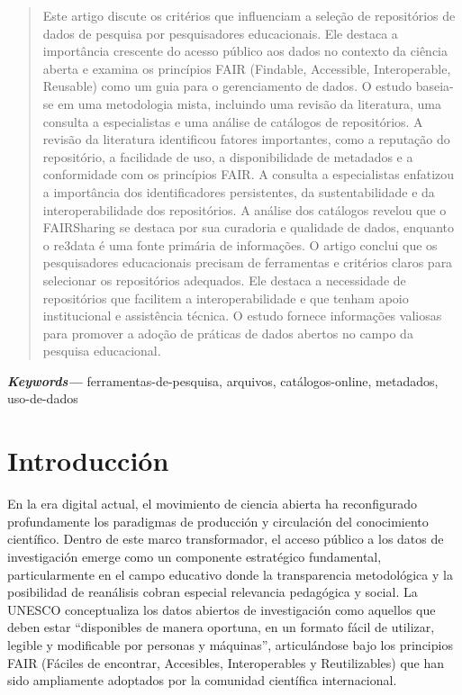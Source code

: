 \documentclass[runningheads]{llncs}
\providecommand{\keywords}[1]
{
  \small	
  \textbf{\textit{Keywords---}} #1
}
\begin{document}
\begin{abstract}
Este artigo discute os critérios que influenciam a seleção de repositórios de dados de pesquisa por pesquisadores educacionais. Ele destaca a importância crescente do acesso público aos dados no contexto da ciência aberta e examina os princípios FAIR (Findable, Accessible, Interoperable, Reusable) como um guia para o gerenciamento de dados. O estudo baseia-se em uma metodologia mista, incluindo uma revisão da literatura, uma consulta a especialistas e uma análise de catálogos de repositórios.
A revisão da literatura identificou fatores importantes, como a reputação do repositório, a facilidade de uso, a disponibilidade de metadados e a conformidade com os princípios FAIR. A consulta a especialistas enfatizou a importância dos identificadores persistentes, da sustentabilidade e da interoperabilidade dos repositórios. A análise dos catálogos revelou que o FAIRSharing se destaca por sua curadoria e qualidade de dados, enquanto o re3data é uma fonte primária de informações.
O artigo conclui que os pesquisadores educacionais precisam de ferramentas e critérios claros para selecionar os repositórios adequados. Ele destaca a necessidade de repositórios que facilitem a interoperabilidade e que tenham apoio institucional e assistência técnica. O estudo fornece informações valiosas para promover a adoção de práticas de dados abertos no campo da pesquisa educacional.
\end{abstract}
\keywords{ferramentas-de-pesquisa, arquivos, catálogos-online, metadados, uso-de-dados}


\section{Introducción}
\label{intro}
En la era digital actual, el movimiento de ciencia abierta ha reconfigurado profundamente los paradigmas de producción y circulación del conocimiento científico. Dentro de este marco transformador, el acceso público a los datos de investigación emerge como un componente estratégico fundamental, particularmente en el campo educativo donde la transparencia metodológica y la posibilidad de reanálisis cobran especial relevancia pedagógica y social. La UNESCO \cite[p.~10]{unesco2021} conceptualiza los datos abiertos de investigación como aquellos que deben estar ``disponibles de manera oportuna, en un formato fácil de utilizar, legible y modificable por personas y máquinas'', articulándose bajo los principios FAIR (Fáciles de encontrar, Accesibles, Interoperables y Reutilizables) que han sido ampliamente adoptados por la comunidad científica internacional.\\
\end{document}

